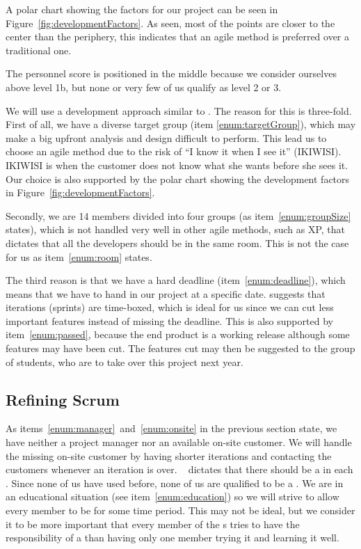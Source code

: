 
A polar chart showing the factors for our project can be seen in Figure~\ref{fig:developmentFactors}.
As seen, most of the points are closer to the center than the periphery, this indicates that an agile method is preferred over a traditional one.

The personnel score is positioned in the middle because we consider ourselves above level 1b, but none or very few of us qualify as level 2 or 3.


We will use a development approach similar to \sos{}.
The reason for this is three-fold.
First of all, we have a diverse target group (item \ref{enum:targetGroup}), which may make a big upfront analysis and design difficult to perform.
This lead us to choose an agile method due to the risk of ``I know it when I see it'' (IKIWISI).
IKIWISI is when the customer does not know what she wants before she sees it.
Our choice is also supported by the polar chart showing the development factors in Figure~\ref{fig:developmentFactors}.

Secondly, we are 14 members divided into four groups (as item~\ref{enum:groupSize} states), which is not handled very well in other agile methods, such as XP, that dictates that all the developers should be in the same room.
This is not the case for us as item~\ref{enum:room} states.

The third reason is that we have a hard deadline (item~\ref{enum:deadline}), which means that we have to hand in our project at a specific date.
\Sos{} suggests that iterations (sprints) are time-boxed, which is ideal for us since we can cut less important features instead of missing the deadline.
This is also supported by item~\ref{enum:passed}, because the end product is a working release although some features may have been cut.
The features cut may then be suggested to the group of students, who are to take over this project next year.


\subsection{Refining Scrum} 
\label{sub:rescrum}
As items~\ref{enum:manager}~and~\ref{enum:onsite} in the previous section state, we have neither a project manager nor an available on-site customer.
We will handle the missing on-site customer by having shorter iterations and contacting the customers whenever an iteration is over.
\Sos{}~\cite{scrumOfScrums} dictates that there should be a \scrummaster{} in each \subgroup{}.
Since none of us have used \scrum{} before, none of us are qualified to be a \scrummaster{}.
We are in an educational situation (see item~\ref{enum:education}) so we will strive to allow every member to be \scrummaster{} for some time period.
This may not be ideal, but we consider it to be more important that every member of the \subgroup{}s tries to have the responsibility of a \scrummaster{} than having only one member trying it and learning it well.

